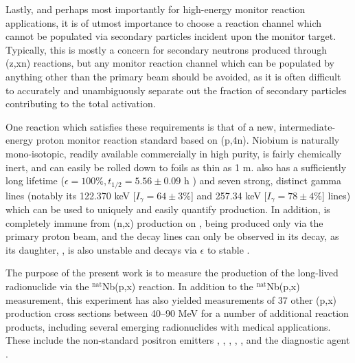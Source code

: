 Lastly, and perhaps most importantly for high-energy monitor reaction applications, it is  of utmost importance to choose a reaction channel which cannot be populated via secondary particles incident upon the monitor target.
Typically, this is  mostly a concern for secondary neutrons produced through (z,xn) reactions, 
but any monitor reaction channel which can be populated by anything other than the primary beam should be avoided, as it is often 
difficult to accurately and unambiguously separate out the fraction of secondary particles contributing to the total activation.  





One  reaction which satisfies these requirements is that of a new, intermediate-energy proton monitor reaction standard based on (p,4n). 
Niobium is naturally mono-isotopic, readily  available commercially in high purity, is fairly chemically inert, and can easily be rolled down to foils as thin as 1 \mmicro m.  
 also has 
a sufficiently long lifetime ($\epsilon=100\%, t_{1/2}=5.56 \pm 0.09$ h \cite{Browne1997})  
and seven strong, distinct gamma lines (notably its 122.370 keV [$I_\gamma = 64 \pm 3\%$] and 257.34 keV [$I_\gamma = 78 \pm 4\%$] lines) which can be used to uniquely and easily   quantify  production. 
In addition,   is completely immune from (n,x) production on  , being produced only via the primary proton beam, and the  decay lines can only be observed in its decay, as its daughter, , is also unstable and decays via $\epsilon$ to stable . 
 
The purpose of the present work is to  measure the production of the long-lived radionuclide   
via the $^\text{nat}$Nb(p,x) reaction. 
In addition to the $^\text{nat}$Nb(p,x) measurement, this experiment has also yielded measurements of 37 other (p,x) production cross sections between 40--90 MeV  for a number of additional reaction products, including several emerging radionuclides with medical applications.
These include the non-standard positron emitters , ,  , ,  , 
and the diagnostic agent . 

